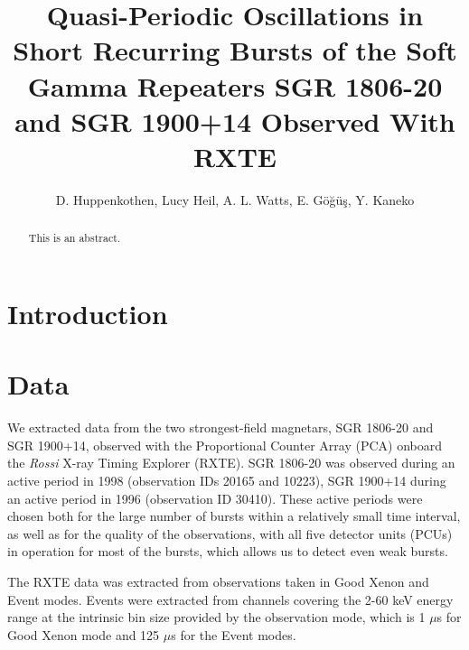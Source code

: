 \documentclass[numberedappendix]{emulateapj}
\begin{document}
\title{Quasi-Periodic Oscillations in Short Recurring Bursts of the Soft Gamma Repeaters SGR 1806-20 and SGR 1900+14 Observed With RXTE}

\author{D. Huppenkothen, Lucy Heil, A. L. Watts,  E. G{\"o}{\u g}{\"u}{\c s}, Y. Kaneko}

 


\begin{abstract}
This is an abstract. 
\end{abstract}
\begin{abstract}
\end{abstract} 



\section{Introduction}

\section{Data}
\label{sec:data}

We extracted data from the two strongest-field magnetars, SGR 1806-20 and SGR 1900+14, observed with the Proportional Counter Array (PCA) onboard the {\it Rossi} X-ray Timing Explorer (RXTE). SGR 1806-20 was observed during an active period in 1998 (observation IDs 20165 and 10223), SGR 1900+14 during an active period in 1996 (observation ID 30410). These active periods were chosen both for the large number of bursts within a relatively small time interval, as well as for the quality of the observations, with all five detector units (PCUs) in operation for most of the bursts, which allows us to detect even weak bursts.

The RXTE data was extracted from observations taken in Good Xenon and Event modes. Events were extracted from channels covering the 2-60 keV energy range at the intrinsic bin size provided by the observation mode, which is 1 $\mu$s for Good Xenon mode and 125 $\mu$s for the Event modes.  
 
\end{document}
